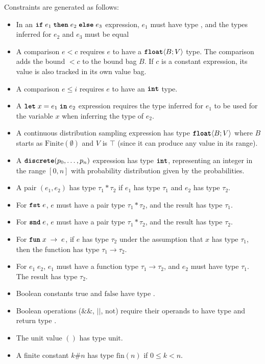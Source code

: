 \documentclass[acmsmall,screen,dvipsnames,x11names,nonacm,anonymous,review]{acmart}
\begin{document}
Constraints are generated as follows:
\begin{itemize}
    \item In an $\text{\ttfamily\bfseries if} \; e_1\; \text{\ttfamily\bfseries then} \; e_2\; \text{\ttfamily\bfseries else} \; e_3$ expression, $e_1$ must have type \bool, and the types inferred for $e_2$ and $e_3$ must be equal
    \item A comparison $e < c$ requires $e$ to have a $\text{\ttfamily\bfseries float}\langle B; V \rangle$ type. The comparison adds the bound $<c$ to the bound bag $B$. If $c$ is a constant expression, its value is also tracked in its own value bag.
    \item A comparison $e \leq i$ requires $e$ to have an $\text{\ttfamily\bfseries int}$ type.
    \item A $\text{\ttfamily\bfseries let} \; x = e_1 \; \text{\ttfamily\bfseries in} \; e_2$ expression requires the type inferred for $e_1$ to be used for the variable $x$ when inferring the type of $e_2$.
    \item A continuous distribution sampling expression has type $\text{\ttfamily\bfseries float}\langle B; V \rangle$ where $B$ starts as $\text{Finite}(\emptyset)$ and $V$ is $\top$ (since it can produce any value in its range).
    \item A $\text{\ttfamily\bfseries discrete}(p_0, \ldots, p_n)$ expression has type $\text{\ttfamily\bfseries int}$, representing an integer in the range $[0,n]$ with probability distribution given by the probabilities.
    \item A pair $(e_1, e_2)$ has type $\tau_1 * \tau_2$ if $e_1$ has type $\tau_1$ and $e_2$ has type $\tau_2$.
    \item For $\text{\ttfamily\bfseries fst} \; e$, $e$ must have a pair type $\tau_1 * \tau_2$, and the result has type $\tau_1$.
    \item For $\text{\ttfamily\bfseries snd} \; e$, $e$ must have a pair type $\tau_1 * \tau_2$, and the result has type $\tau_2$.
    \item For $\text{\ttfamily\bfseries fun} \; x \; \rightarrow \; e$, if $e$ has type $\tau_2$ under the assumption that $x$ has type $\tau_1$, then the function has type $\tau_1 \rightarrow \tau_2$.
    \item For $e_1 \; e_2$, $e_1$ must have a function type $\tau_1 \rightarrow \tau_2$, and $e_2$ must have type $\tau_1$. The result has type $\tau_2$.
    \item Boolean constants $\text{true}$ and $\text{false}$ have type \bool.
    \item Boolean operations ($\&\&$, $||$, $\text{not}$) require their operands to have type \bool{} and return type \bool.
    \item The unit value $()$ has type $\text{unit}$.
    \item A finite constant $k\#n$ has type $\text{fin}(n)$ if $0 \leq k < n$.

\end{itemize}
\end{document}
